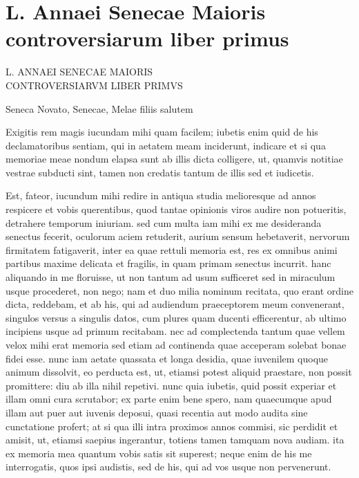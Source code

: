 
\section*{L. Annaei Senecae Maioris controversiarum liber primus}

L. ANNAEI SENECAE MAIORIS \\CONTROVERSIARVM LIBER PRIMVS

\bigskip

Seneca Novato, Senecae, Melae filiis salutem

Exigitis rem magis iucundam mihi quam facilem; iubetis enim quid de his declamatoribus sentiam, qui in aetatem meam inciderunt, indicare et si qua memoriae meae nondum elapsa sunt ab illis dicta colligere, ut, quamvis notitiae vestrae subducti sint, tamen non credatis tantum de illis sed et iudicetis.

Est, fateor, iucundum mihi redire in antiqua studia melioresque ad annos respicere et vobis querentibus, quod tantae opinionis viros audire non potueritis, detrahere temporum iniuriam. sed cum multa iam mihi ex me desideranda senectus fecerit, oculorum aciem retuderit, aurium sensum hebetaverit, nervorum firmitatem fatigaverit, inter ea quae rettuli memoria est, res ex omnibus animi partibus maxime delicata et fragilis, in quam primam senectus incurrit. hanc aliquando in me floruisse, ut non tantum ad usum sufficeret sed in miraculum usque procederet, non nego; nam et duo milia nominum recitata, quo erant ordine dicta, reddebam, et ab his, qui ad audiendum praeceptorem meum convenerant, singulos versus a singulis datos, cum plures quam ducenti efficerentur, ab ultimo incipiens usque ad primum recitabam. nec ad complectenda tantum quae vellem velox mihi erat memoria sed etiam ad continenda quae acceperam solebat bonae fidei esse. nunc iam aetate quassata et longa desidia, quae iuvenilem quoque animum dissolvit, eo perducta est, ut, etiamsi potest aliquid praestare, non possit promittere: diu ab illa nihil repetivi. nunc quia iubetis, quid possit experiar et illam omni cura scrutabor; ex parte enim bene spero, nam quaecumque apud illam aut puer aut iuvenis deposui, quasi recentia aut modo audita sine cunctatione profert; at si qua illi intra proximos annos commisi, sic perdidit et amisit, ut, etiamsi saepius ingerantur, totiens tamen tamquam nova audiam.  ita ex memoria mea quantum vobis satis sit superest; neque enim de his me interrogatis, quos ipsi audistis, sed de his, qui ad vos usque non pervenerunt.

